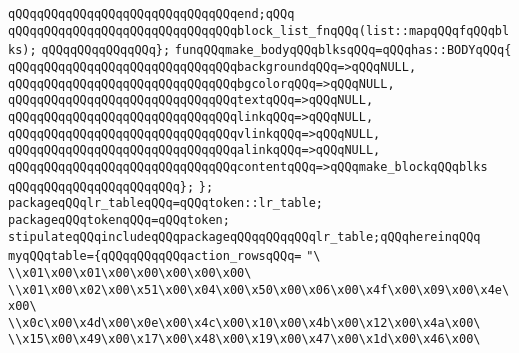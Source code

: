 \verb|qQQqqQQqqQQqqQQqqQQqqQQqqQQqqQQqend;qQQq|\newline
\newline
\verb|qQQqqQQqqQQqqQQqqQQqqQQqqQQqqQQqblock_list_fnqQQq(list::mapqQQqfqQQqblks);|\newline
\verb|qQQqqQQqqQQqqQQq};|\newline
\newline
\verb|funqQQqmake_bodyqQQqblksqQQq=qQQqhas::BODYqQQq{|\newline
\verb|qQQqqQQqqQQqqQQqqQQqqQQqqQQqqQQqbackgroundqQQq=>qQQqNULL,|\newline
\verb|qQQqqQQqqQQqqQQqqQQqqQQqqQQqqQQqbgcolorqQQq=>qQQqNULL,|\newline
\verb|qQQqqQQqqQQqqQQqqQQqqQQqqQQqqQQqtextqQQq=>qQQqNULL,|\newline
\verb|qQQqqQQqqQQqqQQqqQQqqQQqqQQqqQQqlinkqQQq=>qQQqNULL,|\newline
\verb|qQQqqQQqqQQqqQQqqQQqqQQqqQQqqQQqvlinkqQQq=>qQQqNULL,|\newline
\verb|qQQqqQQqqQQqqQQqqQQqqQQqqQQqqQQqalinkqQQq=>qQQqNULL,|\newline
\verb|qQQqqQQqqQQqqQQqqQQqqQQqqQQqqQQqcontentqQQq=>qQQqmake_blockqQQqblks|\newline
\verb|qQQqqQQqqQQqqQQqqQQqqQQq};|\newline
\newline
\newline
\verb|};|\newline
\verb|packageqQQqlr_tableqQQq=qQQqtoken::lr_table;|\newline
\verb|packageqQQqtokenqQQq=qQQqtoken;|\newline
\verb|stipulateqQQqincludeqQQqpackageqQQqqQQqqQQqlr_table;qQQqhereinqQQq|\newline
\verb|myqQQqtable={qQQqqQQqqQQqaction_rowsqQQq=|\newline
\verb|"\|\newline
\verb|\\x01\x00\x01\x00\x00\x00\x00\x00\|\newline
\verb|\\x01\x00\x02\x00\x51\x00\x04\x00\x50\x00\x06\x00\x4f\x00\x09\x00\x4e\x00\|\newline
\verb|\\x0c\x00\x4d\x00\x0e\x00\x4c\x00\x10\x00\x4b\x00\x12\x00\x4a\x00\|\newline
\verb|\\x15\x00\x49\x00\x17\x00\x48\x00\x19\x00\x47\x00\x1d\x00\x46\x00\|\newline
